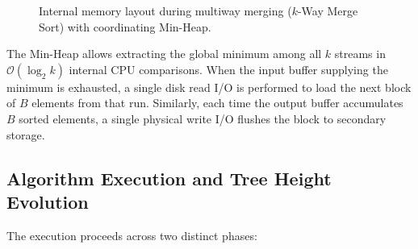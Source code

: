 \begin{figure}[H]
{%
  }
  \caption{Internal memory layout during multiway merging ($k$-Way Merge Sort) with coordinating Min-Heap.}
  \label{fig:multiway-merge-architecture}
\end{figure}

The Min-Heap allows extracting the global minimum among all $k$ streams in $\mathcal{O}(\log_2 k)$ internal CPU comparisons. When the input buffer supplying the minimum is exhausted, a single disk read I/O is performed to load the next block of $B$ elements from that run. Similarly, each time the output buffer accumulates $B$ sorted elements, a single physical write I/O flushes the block to secondary storage.

\subsection{Algorithm Execution and Tree Height Evolution}
\label{subsec:multiway-dynamics}

The execution proceeds across two distinct phases:

